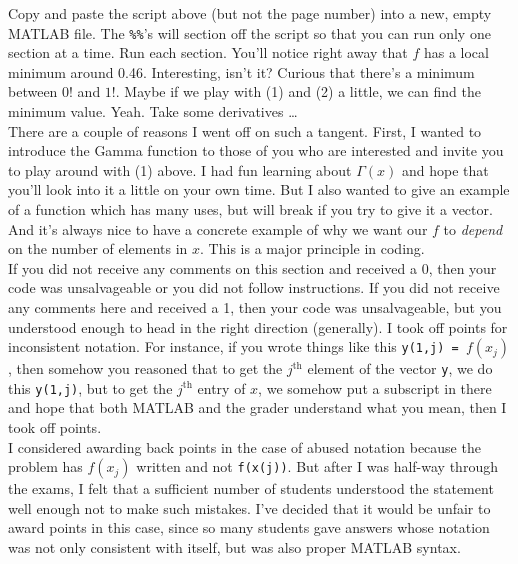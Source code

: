 \documentclass{article}
\begin{document}
Copy and paste the script above (but not the page number) into a new, empty MATLAB file. The \texttt{\%\%}'s will section off the script so that you can run only one section at a time. Run each section. You'll notice right away that $f$ has a local minimum around 0.46. Interesting, isn't it? Curious that there's a minimum between $0!$ and $1!$. Maybe if we play with (1) and (2) a little, we can find the minimum value. Yeah. Take some derivatives \dots \\

There are a couple of reasons I went off on such a tangent. First, I wanted to introduce the Gamma function to those of you who are interested and invite you to play around with (1) above. I had fun learning about $\Gamma (x)$ and hope that you'll look into it a little on your own time. But I also wanted to give an example of a function which has many uses, but will break if you try to give it a vector. And it's always nice to have a concrete example of why we want our $f$ to \emph{depend} on the number of elements in $x$. This is a major principle in coding.\\

If you did not receive any comments on this section and received a 0, then your code was unsalvageable or you did not follow instructions. If you did not receive any comments here and received a 1, then your code was unsalvageable, but you understood enough to head in the right direction (generally). I took off points for inconsistent notation. For instance, if you wrote things like this \texttt{y(1,j) = }$f(x_j)$, then somehow you reasoned that to get the $j^\text{th}$ element of the vector \texttt{y}, we do this \texttt{y(1,j)}, but to get the $j^\text{th}$ entry of $x$, we somehow put a subscript in there and hope that both MATLAB and the grader understand what you mean, then I took off points. \\

I considered awarding back points in the case of abused notation because the problem has $f(x_j)$ written and not \texttt{f(x(j))}. But after I was half-way through the exams, I felt that a sufficient number of students understood the statement well enough not to make such mistakes. I've decided that it would be unfair to award points in this case, since so many students gave answers whose notation was not only consistent with itself, but was also proper MATLAB syntax.
\end{document}
